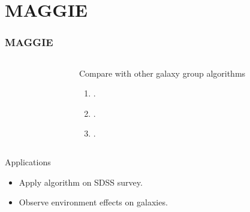 \documentclass{beamer}
\begin{document}
\section{MAGGIE}
\begin{frame}
    \frametitle{MAGGIE}
    \begin{columns}
        \begin{column}{0.45\textwidth}
        \end{column}
        \begin{column}{0.55\textwidth}
            \begin{block}{Compare with other galaxy group algorithms}
                \begin{enumerate}
                    \item \citet{Yang+07}.
                    \item \citet{Berlind+06}.
                    \item \citet{DominguezRomero+12}.
                \end{enumerate}
            \end{block}
        \end{column}
    \end{columns}
    \begin{block}{Applications}
        \begin{itemize}
            \item Apply algorithm on SDSS survey.
            \item Observe environment effects on galaxies.
        \end{itemize}
    \end{block}
\end{frame}


\end{document}
